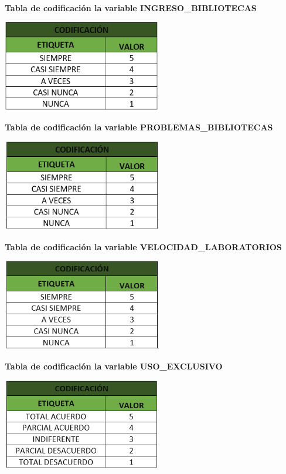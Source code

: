\documentclass[12pt, a4paper, nofontenc, numbers=endperiod]{apa7}
\begin{document}
{\begin{center}
\end{center}
\newpage
\textbf{Tabla de codificación la variable INGRESO\_BIBLIOTECAS}
\begin{center}
	\includegraphics[width=7cm,height=4cm]{Imagenes/Figura23}
\end{center}
\textbf{Tabla de codificación la variable PROBLEMAS\_BIBLIOTECAS}
\begin{center}
	\includegraphics[width=7cm,height=4cm]{Imagenes/Figura24}
\end{center}
\textbf{Tabla de codificación la variable VELOCIDAD\_LABORATORIOS }
\begin{center}
	\includegraphics[width=7cm,height=4cm]{Imagenes/Figura25}
\end{center}
\textbf{Tabla de codificación la variable USO\_EXCLUSIVO}
\begin{center}
	\includegraphics[width=7cm,height=4cm]{Imagenes/Figura26}

\end{center}}
\end{document}
